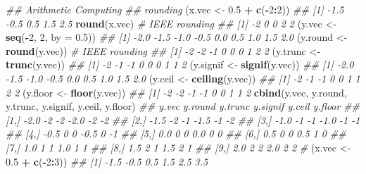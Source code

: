 \documentclass[
]{book}
\newenvironment{Shaded}{\begin{snugshade}}{\end{snugshade}}
\newcommand{\CommentTok}[1]{\textcolor[rgb]{0.56,0.35,0.01}{\textit{#1}}}
\newcommand{\DataTypeTok}[1]{\textcolor[rgb]{0.13,0.29,0.53}{#1}}
\newcommand{\DecValTok}[1]{\textcolor[rgb]{0.00,0.00,0.81}{#1}}
\newcommand{\FloatTok}[1]{\textcolor[rgb]{0.00,0.00,0.81}{#1}}
\newcommand{\KeywordTok}[1]{\textcolor[rgb]{0.13,0.29,0.53}{\textbf{#1}}}
\newcommand{\NormalTok}[1]{#1}
\newcommand{\OperatorTok}[1]{\textcolor[rgb]{0.81,0.36,0.00}{\textbf{#1}}}
\newcommand{\StringTok}[1]{\textcolor[rgb]{0.31,0.60,0.02}{#1}}
\begin{document}
\begin{Shaded}
\begin{Highlighting}[]
\CommentTok{\#\# Arithmetic Computing}
\CommentTok{\#\# rounding}
\NormalTok{(x.vec \textless{}{-}}\StringTok{ }\FloatTok{0.5} \OperatorTok{+}\StringTok{ }\KeywordTok{c}\NormalTok{(}\OperatorTok{{-}}\DecValTok{2}\OperatorTok{:}\DecValTok{2}\NormalTok{))}
\CommentTok{\#\# [1] {-}1.5 {-}0.5  0.5  1.5  2.5}
\KeywordTok{round}\NormalTok{(x.vec) }\CommentTok{\# IEEE rounding}
\CommentTok{\#\# [1] {-}2  0  0  2  2}
\NormalTok{(y.vec \textless{}{-}}\StringTok{ }\KeywordTok{seq}\NormalTok{(}\OperatorTok{{-}}\DecValTok{2}\NormalTok{, }\DecValTok{2}\NormalTok{, }\DataTypeTok{by =} \FloatTok{0.5}\NormalTok{))}
\CommentTok{\#\# [1] {-}2.0 {-}1.5 {-}1.0 {-}0.5  0.0  0.5  1.0  1.5  2.0}
\NormalTok{(y.round \textless{}{-}}\StringTok{ }\KeywordTok{round}\NormalTok{(y.vec)) }\CommentTok{\# IEEE rounding}
\CommentTok{\#\# [1] {-}2 {-}2 {-}1  0  0  0  1  2  2}
\NormalTok{(y.trunc \textless{}{-}}\StringTok{ }\KeywordTok{trunc}\NormalTok{(y.vec))}
\CommentTok{\#\# [1] {-}2 {-}1 {-}1  0  0  0  1  1  2}
\NormalTok{(y.signif \textless{}{-}}\StringTok{ }\KeywordTok{signif}\NormalTok{(y.vec))}
\CommentTok{\#\# [1] {-}2.0 {-}1.5 {-}1.0 {-}0.5  0.0  0.5  1.0  1.5  2.0}
\NormalTok{(y.ceil \textless{}{-}}\StringTok{ }\KeywordTok{ceiling}\NormalTok{(y.vec))}
\CommentTok{\#\# [1] {-}2 {-}1 {-}1  0  0  1  1  2  2}
\NormalTok{(y.floor \textless{}{-}}\StringTok{ }\KeywordTok{floor}\NormalTok{(y.vec))}
\CommentTok{\#\# [1] {-}2 {-}2 {-}1 {-}1  0  0  1  1  2}
\KeywordTok{cbind}\NormalTok{(y.vec, y.round, y.trunc, y.signif, y.ceil, y.floor)}
\CommentTok{\#\#       y.vec y.round y.trunc y.signif y.ceil y.floor}
\CommentTok{\#\#  [1,]  {-}2.0      {-}2      {-}2     {-}2.0     {-}2      {-}2}
\CommentTok{\#\#  [2,]  {-}1.5      {-}2      {-}1     {-}1.5     {-}1      {-}2}
\CommentTok{\#\#  [3,]  {-}1.0      {-}1      {-}1     {-}1.0     {-}1      {-}1}
\CommentTok{\#\#  [4,]  {-}0.5       0       0     {-}0.5      0      {-}1}
\CommentTok{\#\#  [5,]   0.0       0       0      0.0      0       0}
\CommentTok{\#\#  [6,]   0.5       0       0      0.5      1       0}
\CommentTok{\#\#  [7,]   1.0       1       1      1.0      1       1}
\CommentTok{\#\#  [8,]   1.5       2       1      1.5      2       1}
\CommentTok{\#\#  [9,]   2.0       2       2      2.0      2       2}
\CommentTok{\#}
\NormalTok{(x.vec \textless{}{-}}\StringTok{  }\FloatTok{0.5} \OperatorTok{+}\StringTok{ }\KeywordTok{c}\NormalTok{(}\OperatorTok{{-}}\DecValTok{2}\OperatorTok{:}\DecValTok{3}\NormalTok{))}
\CommentTok{\#\# [1] {-}1.5 {-}0.5  0.5  1.5  2.5  3.5}

\end{Highlighting}
\end{Shaded}
\end{document}
